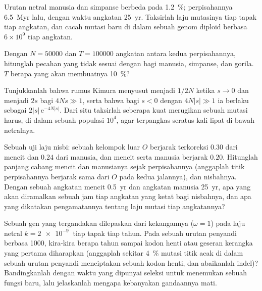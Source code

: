 \begin{exercise}[$\star\star$]\label{exo:b3:molecular-evolution:8}
Urutan netral manusia dan simpanse berbeda pada \qty{1.2}{\%}; perpisahannya
\qty{6.5}{Myr} lalu, dengan waktu angkatan \qty{25}{yr}. Taksirlah
laju mutasinya tiap tapak tiap angkatan, dan cacah mutasi baru
di dalam sebuah genom diploid berbasa $6\times 10^{9}$ tiap angkatan.
\end{exercise}

\begin{exercise}[$\star\star$]\label{exo:b3:molecular-evolution:9}
Dengan $N = \num{50000}$ dan $T = \num{100000}$ angkatan antara kedua
perpisahannya, hitunglah pecahan  yang tidak sesuai dengan
 bagi manusia, simpanse, dan gorila. $T$ berapa yang akan membuatnya
\qty{10}{\%}?
\end{exercise}

\begin{exercise}[$\star\star\star$]\label{exo:b3:molecular-evolution:10}
Tunjukkanlah bahwa rumus Kimura menyusut menjadi $1/2N$ ketika $s \to 0$ dan menjadi $2s$
bagi $4Ns \gg 1$, serta bahwa bagi $s < 0$ dengan $4N|s| \gg 1$ ia berlaku sebagai
$2|s|\,\mathrm{e}^{-4N|s|}$. Dari situ taksirlah seberapa kuat merugikan sebuah
mutasi harus, di dalam sebuah populasi $10^{4}$, agar 
terpangkas seratus kali lipat di bawah netralnya.
\end{exercise}

\begin{exercise}[$\star\star\star$]\label{exo:b3:molecular-evolution:11}
Sebuah uji laju nisbi: sebuah kelompok luar $O$ berjarak terkoreksi $0.30$
dari mencit dan $0.24$ dari manusia, dan mencit serta manusia berjarak $0.20$. Hitunglah panjang
cabang mencit dan manusianya sejak perpisahannya (anggaplah titik perpisahannya berjarak sama dari
$O$ pada kedua jalannya), dan nisbahnya. Dengan sebuah angkatan mencit
\qty{0.5}{yr} dan angkatan manusia \qty{25}{yr}, apa yang akan diramalkan sebuah jam
tiap angkatan yang ketat bagi nisbahnya, dan apa yang dikatakan
pengamatannya tentang laju mutasi tiap angkatannya?
\end{exercise}

\begin{exercise}[$\star\star\star$]\label{exo:b3:molecular-evolution:12}
Sebuah gen yang tergandakan dilepaskan dari kekangannya ($\omega = 1$) pada
laju netral $k = \qty{2e-9}{}$ tiap tapak tiap tahun. Pada sebuah urutan penyandi
berbasa 1000, kira-kira berapa tahun sampai kodon henti atau
geseran kerangka yang pertama diharapkan (anggaplah sekitar \qty{4}{\%} mutasi titik acak
di dalam sebuah urutan penyandi menciptakan sebuah kodon henti, dan abaikanlah indel)?
Bandingkanlah dengan waktu yang dipunyai seleksi untuk menemukan sebuah fungsi baru, lalu jelaskanlah
mengapa kebanyakan gandaannya mati.
\end{exercise}

